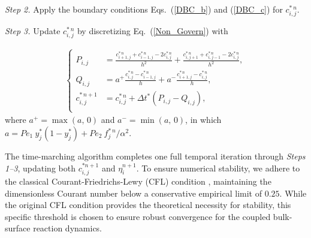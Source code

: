 \documentclass[lineno]{JFM-FLM_Au}
\begin{document}
{\noindent \textit{Step 2.} Apply the boundary conditions Eqs.~(\ref{DBC_b}) and (\ref{DBC_c}) for $c_{i,j}^{*\,n}$.

\noindent \textit{Step 3.} Update $c_{i,j}^{*\,n}$ by discretizing Eq.~(\ref{Non_Govern}) with

\begin{align} \label{C_Difference}
\left\{\begin{aligned}
 P_{i,j} &= {\frac{c_{i+1,j}^{*\,n} + c_{i-1,j}^{*\,n} - 2c_{i,j}^{*\,n}}{h^2}} + {\frac{c_{i,j+1}^{*\,n} + c_{i,j-1}^{*\,n} - 2c_{i,j}^{*\,n}}{h^2}},\\
 Q_{i,j} &= a^{+} \frac{c_{i,j}^{*\,n} - c_{i-1,j}^{*\,n}}{h} + a^{-} \frac{c_{i+1,j}^{*\,n} - c_{i,j}^{*\,n}}{h}, \\
 c_{i,j}^{*\,n+1} &= c_{i,j}^{*\,n} + \Delta t^* \left( P_{i,j}-Q_{i,j} \right), \\  
\end{aligned}\right.
\end{align}
where $a^{+} = \max \left(a, \, 0 \right)$ and $a^{-} = \min \left(a, \, 0 \right)$, in which $a     = Pe_1~y^*_j (1-y^*_j)+ Pe_2~f_j^{*\,n} / \alpha^2$.



The time-marching algorithm completes one full temporal iteration through \textit{Steps 1--3}, updating both $c_{i,j}^{*n+1}$ and $\eta_i^{n+1}$. To ensure numerical stability, we adhere to the classical Courant-Friedrichs-Lewy (CFL) condition \citep{courant1967partial}, maintaining the dimensionless Courant number below a conservative empirical limit of $0.25$. While the original CFL condition provides the theoretical necessity for stability, this specific threshold is chosen to ensure robust convergence for the coupled bulk-surface reaction dynamics.

}
\end{document}
